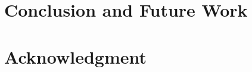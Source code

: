 \documentclass[journal]{IEEEtran}
\begin{document}
\section{Conclusion and Future Work}\label{sec:Conclusion and Future Work}



\section*{Acknowledgment}\label{sec:Acknowledgment}




\ifCLASSOPTIONcaptionsoff
  \newpage
\fi




% 

\end{document}
